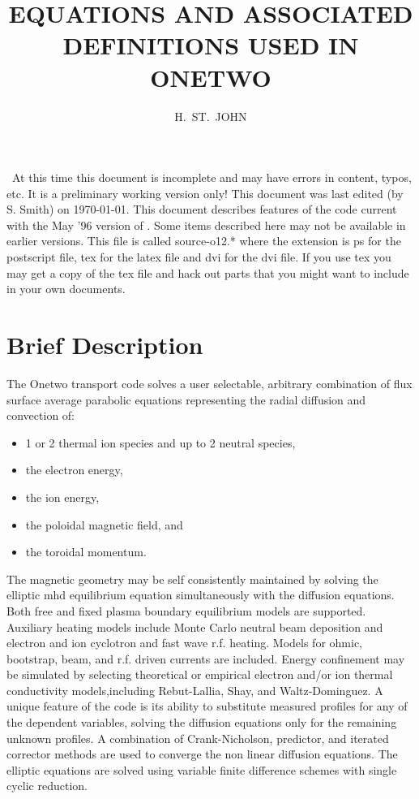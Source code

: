 \title{ EQUATIONS AND ASSOCIATED DEFINITIONS USED IN  ONETWO}
\author{H.~ST.~JOHN}
\date{   }   %
\maketitle


\boldmath\
At this time this document is incomplete and may have errors in
content, typos, etc. It is a preliminary working version only!
This document was last edited (by S. Smith) on \today.
This document describes features of the code current with
the May '96 version of \ot. Some items described here
may not be available in earlier versions. This file is
called  source-o12.*  where the extension is ps for the postscript file, 
tex for the latex file and dvi for 
the dvi file. If you use tex you may get a copy
of the tex file and hack out parts that you might want 
to include in your own documents.

\section{Brief Description}
The Onetwo transport code solves a user selectable, arbitrary
combination of flux surface average parabolic equations representing
the radial diffusion and convection of:
\begin{itemize}
\item 1 or 2 thermal ion species and
up to 2 neutral species, 
\item the electron energy, 
\item the ion energy, 
\item the poloidal magnetic field, and 
\item the toroidal momentum.  
\end{itemize}
The magnetic geometry may be
self consistently maintained by solving the elliptic mhd equilibrium
equation simultaneously with the diffusion equations.  Both free and
fixed plasma boundary equilibrium models are supported. Auxiliary
heating models include Monte Carlo neutral beam deposition and electron
and ion cyclotron and fast wave r.f. heating.  Models for ohmic, bootstrap,
beam, and r.f. driven currents are included.  Energy confinement may be
simulated by selecting theoretical or empirical electron and/or ion
thermal conductivity models,including Rebut-Lallia, Shay, and Waltz-Dominguez.  A unique feature of the code is its ability to substitute
measured profiles for any of the dependent variables, solving the
diffusion equations only for the remaining unknown profiles. A combination
of Crank-Nicholson, predictor, and iterated corrector methods are used to
converge the non linear diffusion equations. The elliptic equations are
solved using variable finite difference schemes with single cyclic
reduction.


